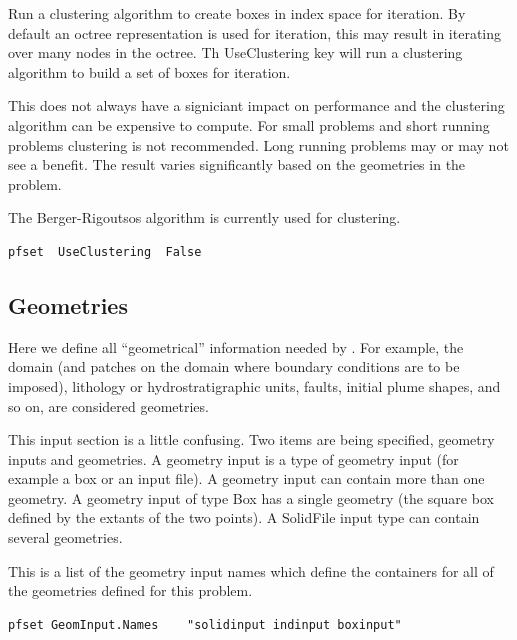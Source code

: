 {
Run a clustering algorithm to create boxes in index space for
iteration. By default an octree representation is used for iteration,
this may result in iterating over many nodes in the octree.
Th UseClustering key will run a clustering algorithm to build a set of boxes
for iteration.

This does not always have a signiciant impact on performance and the
clustering algorithm can be expensive to compute.  For small problems
and short running problems clustering is not recommended.  Long
running problems may or may not see a benefit.  The result varies
significantly based on the geometries in the problem.

The Berger-Rigoutsos algorithm is currently used for clustering.
}
\begin{display}\begin{verbatim}
pfset  UseClustering  False
\end{verbatim}\end{display}

\subsection{Geometries}
\label{Geometries}

Here we define all ``geometrical'' information needed by \parflow{}.
For example, the domain (and patches on the domain where boundary
conditions are to be imposed), lithology or hydrostratigraphic units,
faults, initial plume shapes, and so on, are considered geometries.

This input section is a little confusing.  Two items are being
specified, geometry inputs and geometries.  A geometry input is a type
of geometry input (for example a box or an input file).  A geometry input
can contain more than one geometry.  A geometry input of type Box
has a single geometry (the square box defined by the extants of the
two points).  A SolidFile input type can contain several geometries.

{
This is a list of the geometry input names which define the containers
for all of the geometries defined for this problem.
}
\begin{display}\begin{verbatim}
pfset GeomInput.Names    "solidinput indinput boxinput"
\end{verbatim}\end{display}

